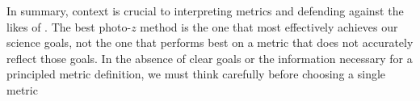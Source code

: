 
In summary, context is crucial to interpreting metrics and defending against the likes of \trainz.
The best photo-$z$ method is the one that most effectively achieves our science goals, not the one that performs best on a metric that does not accurately reflect those goals.
In the absence of clear goals or the information necessary for a principled metric definition, we must think carefully before choosing a single metric

%

